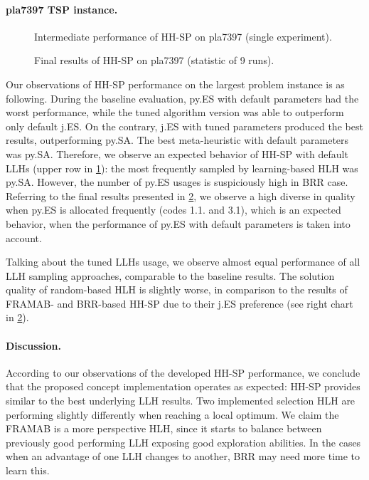 \paragraph{pla7397 TSP instance.}
\begin{figure}[t]
	\centering
	\vspace{-20pt}
	
	\caption{Intermediate performance of HH-SP on pla7397 (single experiment).}
	\vspace{-10pt}
	\label{eval:pict:hh-sp:pla7397 intermediate}
\end{figure}

\begin{figure}[b]
	\centering
	\vspace{-20pt}
	
	\caption{Final results of HH-SP on pla7397 (statistic of 9 runs).}
	\vspace{-5pt}
	\label{eval:pict:hh-sp:pla7397 final}
\end{figure}
Our observations of HH-SP performance on the largest problem instance is as following. During the baseline evaluation, py.ES with default parameters had the worst performance, while the tuned algorithm version was able to outperform only default j.ES. On the contrary, j.ES with tuned parameters produced the best results, outperforming py.SA. The best meta-heuristic with default parameters was py.SA. Therefore, we observe an expected behavior of HH-SP with default LLHs (upper row in \cref{eval:pict:hh-sp:pla7397 intermediate}): the most frequently sampled by learning-based HLH was py.SA. However, the number of py.ES usages is suspiciously high in BRR case. Referring to the final results presented in \cref{eval:pict:hh-sp:pla7397 final}, we observe a high diverse in quality when py.ES is allocated frequently (codes 1.1. and 3.1), which is an expected behavior, when the performance of py.ES with default parameters is taken into account.

Talking about the tuned LLHs usage, we observe almost equal performance of all LLH sampling approaches, comparable to the baseline results. The solution quality of random-based HLH is slightly worse, in comparison to the results of FRAMAB- and BRR-based HH-SP due to their j.ES preference (see right chart in \cref{eval:pict:hh-sp:pla7397 final}).

\paragraph{Discussion.} According to our observations of the developed HH-SP performance, we conclude that the proposed concept implementation operates as expected: HH-SP provides similar to the best underlying LLH results. Two implemented selection HLH are performing slightly differently when reaching a local optimum. We claim the FRAMAB is a more perspective HLH, since it starts to balance between previously good performing LLH exposing good exploration abilities. In the cases when an advantage of one LLH changes to another, BRR may need more time to learn this.

